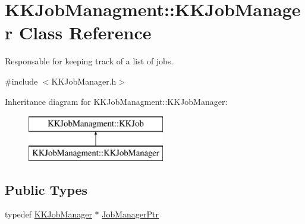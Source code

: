 \hypertarget{class_k_k_job_managment_1_1_k_k_job_manager}{}\section{K\+K\+Job\+Managment\+:\+:K\+K\+Job\+Manager Class Reference}
\label{class_k_k_job_managment_1_1_k_k_job_manager}


Responsable for keeping track of a list of jobs.  




{\ttfamily \#include $<$K\+K\+Job\+Manager.\+h$>$}

Inheritance diagram for K\+K\+Job\+Managment\+:\+:K\+K\+Job\+Manager\+:\begin{figure}[H]
\begin{center}
\leavevmode
\includegraphics[height=2.000000cm]{class_k_k_job_managment_1_1_k_k_job_manager}
\end{center}
\end{figure}
\subsection*{Public Types}
\begin{DoxyCompactItemize}
\item 
typedef \hyperlink{class_k_k_job_managment_1_1_k_k_job_manager}{K\+K\+Job\+Manager} $\ast$ \hyperlink{class_k_k_job_managment_1_1_k_k_job_manager_a3e186b42e759f71ceb6f3d04f4e8f74d}{Job\+Manager\+Ptr}
\end{DoxyCompactItemize}
